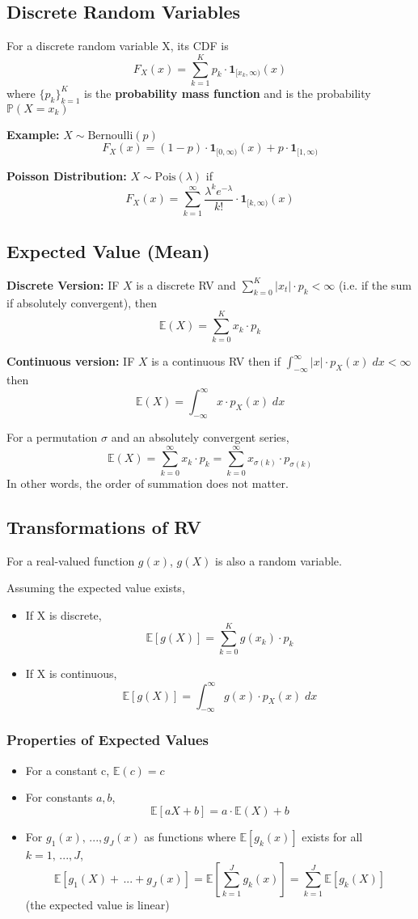 \documentclass[12pt]{article}
\renewcommand{\P}{\mathbb{P}}
\newcommand{\E}{\mathbb{E}}
\begin{document}
\subsection{Discrete Random Variables}
For a discrete random variable X, its CDF is 
\[F_X(x) = \sum_{k=1}^K p_k \cdot \mathbf{1}_{[x_k, \infty)}(x)\]
where $\{p_k\}_{k=1}^K$ is the \textbf{probability mass function} and is the probability $\P(X = x_k)$

\textbf{Example:} $X \sim \text{Bernoulli}(p)$
\[F_X(x) = (1-p)\cdot \mathbf{1}_{[0, \infty)}(x) + p\cdot \mathbf{1}_{[1, \infty)}\]

\textbf{Poisson Distribution:} $X \sim \text{Pois}(\lambda)$ if 
\[F_X(x) = \sum_{k=1}^\infty \frac{\lambda^k e^{-\lambda}}{k!} \cdot \mathbf{1}_{[k, \infty)}(x)\]

\subsection{Expected Value (Mean)}
\textbf{Discrete Version:} IF $X$ is a discrete RV and $\sum_{k=0}^K |x_t| \cdot p_k < \infty$ (i.e. if the sum if absolutely convergent), then 
\[\E(X) = \sum_{k=0}^K x_k \cdot p_k\]

\textbf{Continuous version:} IF $X$ is a continuous RV then if $\int_{-\infty}^{\infty} |x| \cdot p_X(x)\; dx < \infty$ then
\[\E(X) = \int_{-\infty}^{\infty} x\cdot p_X(x)\; dx\]

For a permutation $\sigma$ and an absolutely convergent series, 
\[\E(X) = \sum_{k=0}^\infty x_k \cdot p_k = \sum_{k=0}^\infty x_{\sigma(k)} \cdot p_{\sigma(k)}\]
In other words, the order of summation does not matter. 

\subsection{Transformations of RV}
For a real-valued function $g(x)$, $g(X)$ is also a random variable.

Assuming the expected value exists, 
\begin{itemize}
    \item If X is discrete, 
    \[\E[g(X)] = \sum_{k=0}^K g(x_k) \cdot p_k\]
    \item If X is continuous,
    \[\E[g(X)] = \int_{-\infty}^{\infty} g(x) \cdot p_X(x)\; dx\]
\end{itemize}

\subsubsection*{Properties of Expected Values}
\begin{itemize}
    \item For a constant c, $\E(c) = c$
    \item For constants $a, b$, 
    \[\E[aX + b] = a\cdot \E(X) + b\]
    \item For $g_1(x), \, ..., g_J(x)$ as functions where $\E[g_k(x)]$ exists for all $k = 1, \, ..., J$, 
    \[\E[g_1(X) + \, ... + g_J(x)] = \E\left[\sum_{k=1}^J g_k(x)\right] = \sum_{k=1}^J \E[g_k(X)]\]
    (the expected value is linear)
\end{itemize}
\end{document}
